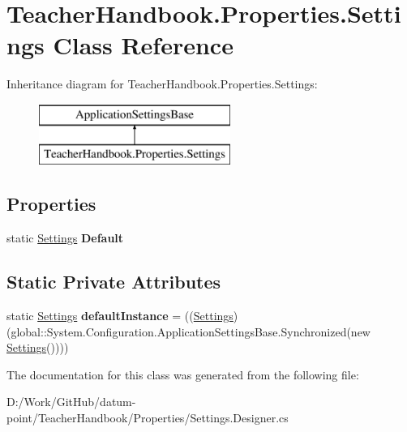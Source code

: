 \hypertarget{class_teacher_handbook_1_1_properties_1_1_settings}{}\section{Teacher\+Handbook.\+Properties.\+Settings Class Reference}
\label{class_teacher_handbook_1_1_properties_1_1_settings}
Inheritance diagram for Teacher\+Handbook.\+Properties.\+Settings\+:\begin{figure}[H]
\begin{center}
\leavevmode
\includegraphics[height=2.000000cm]{d0/d4b/class_teacher_handbook_1_1_properties_1_1_settings}
\end{center}
\end{figure}
\subsection*{Properties}
\begin{DoxyCompactItemize}
\item 
\mbox{\label{class_teacher_handbook_1_1_properties_1_1_settings_a7c06e1129e2b621773a8243e3ff15641}} 
static \mbox{\hyperlink{class_teacher_handbook_1_1_properties_1_1_settings}{Settings}} {\bfseries Default}
\end{DoxyCompactItemize}
\subsection*{Static Private Attributes}
\begin{DoxyCompactItemize}
\item 
\mbox{\label{class_teacher_handbook_1_1_properties_1_1_settings_a0ab4c8518be984ba2f07b4553ab289f2}} 
static \mbox{\hyperlink{class_teacher_handbook_1_1_properties_1_1_settings}{Settings}} {\bfseries default\+Instance} = ((\mbox{\hyperlink{class_teacher_handbook_1_1_properties_1_1_settings}{Settings}})(global\+::\+System.\+Configuration.\+Application\+Settings\+Base.\+Synchronized(new \mbox{\hyperlink{class_teacher_handbook_1_1_properties_1_1_settings}{Settings}}())))
\end{DoxyCompactItemize}


The documentation for this class was generated from the following file\+:\begin{DoxyCompactItemize}
\item 
D\+:/\+Work/\+Git\+Hub/datum-\/point/\+Teacher\+Handbook/\+Properties/Settings.\+Designer.\+cs\end{DoxyCompactItemize}
